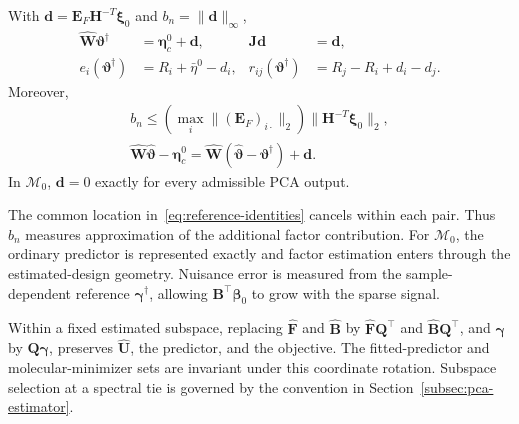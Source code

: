 \begin{proposition}
\label{prop:reference-representation}
With $\mathbf d=\bm{E}_F\bm{H}^{-T}\bm{\xi}_0$ and $b_n=\|\mathbf d\|_\infty$,
\begin{equation}
 \begin{aligned}
 \widehat{\bm{W}}\bm{\vartheta}^\dagger&=\bm{\eta}_c^0+\mathbf d, & \bm{J}\mathbf d&=\mathbf d,\\
 e_i(\bm{\vartheta}^\dagger)&=R_i+\bar\eta^0-d_i, &
 r_{ij}(\bm{\vartheta}^\dagger)&=R_j-R_i+d_i-d_j.
 \end{aligned}
 \label{eq:reference-identities}
\end{equation}
Moreover,
\begin{equation}
 \begin{gathered}
b_n\le
 \left(\max_i\|(\bm{E}_F)_{i\cdot}\|_2\right)\|\bm{H}^{-T}\bm{\xi}_0\|_2,
 \\
 \widehat{\bm{W}}\widehat{\bm{\vartheta}}-\bm{\eta}_c^0
 =\widehat{\bm{W}}(\widehat{\bm{\vartheta}}-\bm{\vartheta}^\dagger)+\mathbf d.
 \end{gathered}
 \label{eq:approximation-decomposition}
\end{equation}
In $\mathcal M_0$, $\mathbf d=0$ exactly for every admissible PCA output.
\end{proposition}
The common location in~\eqref{eq:reference-identities} cancels within each pair. Thus $b_n$ measures approximation of the additional factor contribution. For $\mathcal M_0$, the ordinary predictor is represented exactly and factor estimation enters through the estimated-design geometry. Nuisance error is measured from the sample-dependent reference $\bm{\gamma}^\dagger$, allowing $\bm{B}^\top\bm{\beta}_0$ to grow with the sparse signal.

Within a fixed estimated subspace, replacing $\widehat{\bm{F}}$ and $\widehat{\bm{B}}$ by $\widehat{\bm{F}}\bm{Q}^\top$ and $\widehat{\bm{B}}\bm{Q}^\top$, and $\bm{\gamma}$ by $\bm{Q}\bm{\gamma}$, preserves $\widehat{\bm{U}}$, the predictor, and the objective. The fitted-predictor and molecular-minimizer sets are invariant under this coordinate rotation. Subspace selection at a spectral tie is governed by the convention in Section~\ref{subsec:pca-estimator}.

